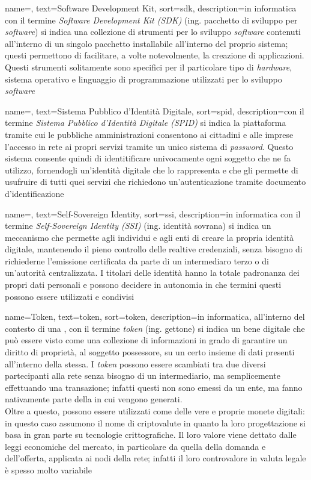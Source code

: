 {
	name=,
	text=Software Development Kit,
	sort=sdk,
	description={in informatica con il termine \emph{Software Development Kit (SDK)} (ing. pacchetto di sviluppo per \textit{software}) si indica una collezione di strumenti per lo sviluppo \textit{software} contenuti all'interno di un singolo pacchetto installabile all'interno del proprio sistema; questi permettono di facilitare, a volte notevolmente, la creazione di applicazioni. Questi strumenti solitamente sono specifici per il particolare tipo di \textit{hardware}, sistema operativo e linguaggio di programmazione utilizzati per lo sviluppo \textit{software}}
}

{
	name=,
	text=Sistema Pubblico d'Identità Digitale,
	sort=spid,
	description={con il termine \emph{Sistema Pubblico d'Identità Digitale (SPID)} si indica la piattaforma tramite cui le pubbliche amministrazioni consentono ai cittadini e alle imprese l'accesso in rete ai propri servizi tramite un unico sistema di \textit{password}. Questo sistema consente quindi di identitificare univocamente ogni soggetto che ne fa utilizzo, fornendogli un'identità digitale che lo rappresenta e che gli permette di usufruire di tutti quei servizi che richiedono un'autenticazione tramite documento d'identificazione}
}

{
	name=,
	text=Self-Sovereign Identity,
	sort=ssi,
	description={in informatica con il termine \emph{Self-Sovereign Identity (SSI)} (ing. identità sovrana) si indica un meccanismo che permette agli individui e agli enti di creare la propria identità digitale, mantenendo il pieno controllo delle realtive credenziali, senza bisogno di richiederne l'emissione certificata da parte di un intermediaro terzo o di un'autorità centralizzata. I titolari delle identità hanno la totale padronanza dei propri dati personali e possono decidere in autonomia in che termini questi possono essere utilizzati e condivisi}
}

{
	name=Token,
	text=token,
	sort=token,
	description={in informatica, all'interno del contesto di una , con il termine \emph{token} (ing. gettone) si indica un bene digitale che può essere visto come una collezione di informazioni in grado di garantire un diritto di proprietà, al soggetto possessore, su un certo insieme di dati presenti all'interno della  stessa. I \emph{token} possono essere scambiati tra due diversi partecipanti alla rete senza bisogno di un intermediario, ma semplicemente effettuando una transazione; infatti questi non sono emessi da un ente, ma fanno nativamente parte della  in cui vengono generati.\\
	Oltre a questo, possono essere utilizzati come delle vere e proprie monete digitali: in questo caso assumono il nome di criptovalute in quanto la loro progettazione si basa in gran parte su tecnologie crittografiche. Il loro valore viene dettato dalle leggi economiche del mercato, in particolare da quella della domanda e dell'offerta, applicata ai nodi della rete; infatti il loro controvalore in valuta legale è spesso molto variabile}
}

